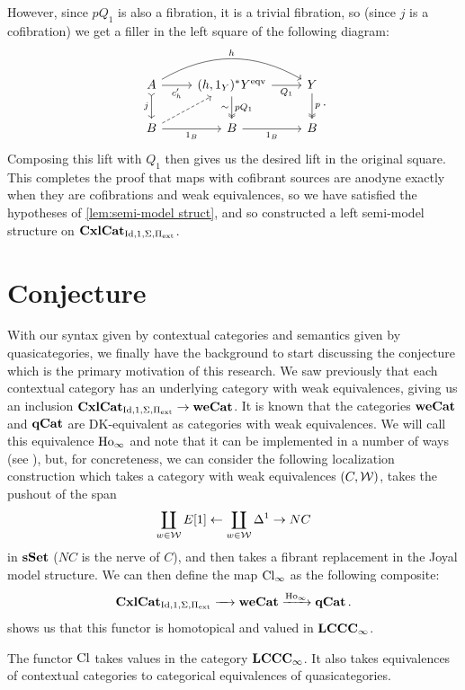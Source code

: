 \documentclass{amsart}
\begin{document}
\begin{sketch}
    However, since $pQ_1$ is also a fibration, it is a trivial fibration, so (since $j$ is a cofibration) we get a filler in the left square of the following diagram:
    \[\begin{tikzcd}
        A \arrow[r, "c_h'"'] \arrow[rr, bend left, "h"] \arrow[d, tail, "j"'] & {(h,1_Y)^*Y^{\eqv}} \arrow[r, "Q_1"'] \arrow[d, two heads, "pQ_1", "\sim"'] & Y \arrow[d, two heads, "p"]\\
        B \arrow[ur, dashed] \arrow[r, "1_B"'] & B \arrow[r, "1_B"'] & B
    \end{tikzcd}.\]
    Composing this lift with $Q_1$ then gives us the desired lift in the original square. This completes the proof that maps with cofibrant sources are anodyne exactly when they are cofibrations and weak equivalences, so we have satisfied the hypotheses of \ref{lem:semi-model struct}, and so constructed a left semi-model structure on $\operatorname{\mathbf{CxlCat}}_{\operatorname{Id},1,\Sigma,\Pi_{\operatorname{ext}}}$.
\end{sketch}

\section{Conjecture}

With our syntax given by contextual categories and semantics given by quasicategories, we finally have the background to start discussing the conjecture which is the primary motivation of this research. We saw previously that each contextual category has an underlying category with weak equivalences, giving us an inclusion $\operatorname{\mathbf{CxlCat}}_{\operatorname{Id},1,\Sigma,\Pi_{\operatorname{ext}}}\to\operatorname{\mathbf{weCat}}$. It is known that the categories $\operatorname{\mathbf{weCat}}$ and $\operatorname{\mathbf{qCat}}$ are DK-equivalent as categories with weak equivalences. We will call this equivalence $\operatorname{Ho}_\infty$ and note that it can be implemented in a number of ways (see \cite[$\S1.6$]{Barwick}), but, for concreteness, we can consider the following localization construction which takes a category with weak equivalences $(C,\mathcal{W})$, takes the pushout of the span
$$ \coprod_{w\in\mathcal{W}}E[1]\leftarrow\coprod_{w\in\mathcal{W}}\Delta^1\to NC $$
in $\operatorname{\mathbf{sSet}}$ ($NC$ is the nerve of $C$), and then takes a fibrant replacement in the Joyal model structure. We can then define the map $\operatorname{Cl}_\infty$ as the following composite:
\[\operatorname{\mathbf{CxlCat}}_{\operatorname{Id},1,\Sigma,\Pi_{\operatorname{ext}}}\xrightarrow{\quad}\operatorname{\mathbf{weCat}}\xrightarrow{\operatorname{Ho}_\infty}\operatorname{\mathbf{qCat}}.\]
\cite{Kapulkin} shows us that this functor is homotopical and valued in $\operatorname{\mathbf{LCCC}}_\infty$.
\begin{thm}\cite[Thm. 5.8]{Kapulkin}
    The functor $\operatorname{Cl}$ takes values in the category $\operatorname{\mathbf{LCCC}}_\infty$. It also takes equivalences of contextual categories to categorical equivalences of quasicategories.
\end{thm}
\end{document}
